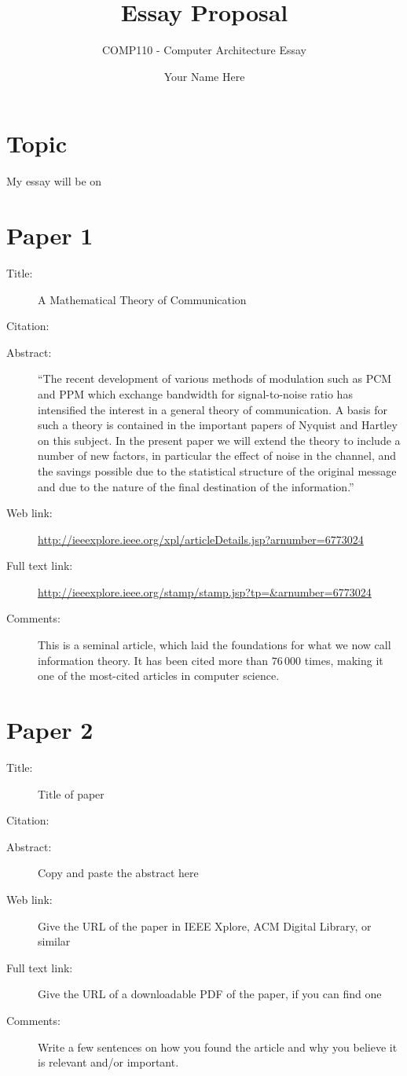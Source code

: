 \documentclass{scrartcl}
\title{Essay Proposal}
\subtitle{COMP110 - Computer Architecture Essay}
\author{Your Name Here}
\begin{document}
\maketitle

\section*{Topic}

My essay will be on

\section*{Paper 1}
\begin{description}
\item[Title:] A Mathematical Theory of Communication
\item[Citation:] \cite{shannon}
\item[Abstract:] ``The recent development of various methods of modulation such as PCM and PPM which exchange bandwidth for signal-to-noise ratio has intensified the interest in a general theory of communication. A basis for such a theory is contained in the important papers of Nyquist and Hartley on this subject. In the present paper we will extend the theory to include a number of new factors, in particular the effect of noise in the channel, and the savings possible due to the statistical structure of the original message and due to the nature of the final destination of the information.''
\item[Web link:] \url{http://ieeexplore.ieee.org/xpl/articleDetails.jsp?arnumber=6773024}
\item[Full text link:] \url{http://ieeexplore.ieee.org/stamp/stamp.jsp?tp=&arnumber=6773024}
\item[Comments:] This is a seminal article, which laid the foundations for what we now call information theory.
	It has been cited more than $76\,000$ times, making it one of the most-cited articles in computer science.
\end{description}

\section*{Paper 2}
\begin{description}
\item[Title:] Title of paper
\item[Citation:] \cite{bibtex_key}
\item[Abstract:] Copy and paste the abstract here
\item[Web link:] Give the URL of the paper in IEEE Xplore, ACM Digital Library, or similar
\item[Full text link:] Give the URL of a downloadable PDF of the paper, if you can find one
\item[Comments:] Write a few sentences on how you found the article and why you believe it is relevant and/or important.
\end{description}
\end{document}
